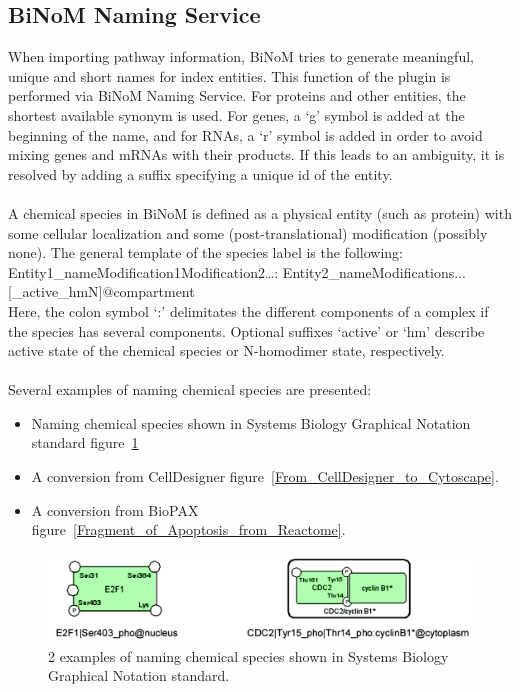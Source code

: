\subsection{BiNoM Naming Service}\label{BiNoM_Naming_Service}
When importing pathway information, BiNoM tries to generate meaningful, unique and short names for index entities. This function of the plugin is performed via BiNoM Naming Service. For proteins and other entities, the shortest available synonym is used. For genes, a ‘g’ symbol is added at the beginning of the name, and for RNAs, a ‘r’ symbol is added in order to avoid mixing genes and mRNAs with their products. If this leads to an ambiguity, it is resolved by adding a suffix specifying a unique id of the entity.\\\\
A chemical species in BiNoM is defined as a physical entity (such as protein) with some cellular localization and some (post-translational) modification (possibly none). The general template of the species label is the following:\\
Entity1\_name\textbar Modification1\textbar Modification2\textbar…: Entity2\_name\textbar Modifications...[\_active\textbar \_hmN]@compartment\\
Here, the colon symbol ‘:’ delimitates the different components of a complex if the species has several components. Optional suffixes ‘active’ or ‘hm’ describe active state of the chemical species or N-homodimer state, respectively.\\\\ Several examples of naming chemical species are presented:
\begin{itemize}
\item Naming chemical species shown in Systems Biology Graphical Notation standard figure~\ref{Names_in_SBGN_standard}
\item A conversion from CellDesigner figure~\ref{From_CellDesigner_to_Cytoscape}.
\item A conversion from BioPAX figure~\ref{Fragment_of_Apoptosis_from_Reactome}.
\end{itemize}
\begin{figure}
\centering
\includegraphics[width=14 cm]{graphics/Names_in_SBGN_standard}
\caption{2 examples of naming chemical species shown in Systems Biology Graphical Notation standard.}
\label{Names_in_SBGN_standard}
\end{figure}
